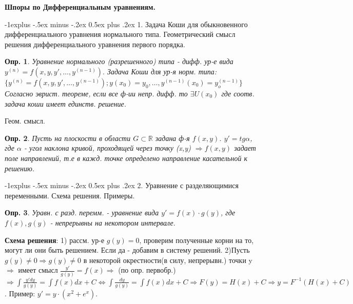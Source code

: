 \documentclass[unicode,10pt, landscape]{article}
\makeatletter
\renewcommand{\subsection}{\@startsection{subsection}{2}{0mm}%
                                {-1explus -.5ex minus -.2ex}%
                                {0.5ex plus .2ex}%
                                {\normalfont\normalsize\bfseries}}
\makeatother
\begin{document}
\raggedright
\footnotesize


\setlength{\premulticols}{1pt}
\setlength{\postmulticols}{1pt}
\setlength{\multicolsep}{1pt}
\setlength{\columnsep}{2pt}
\newtheorem{Def}{Опр.}
\newtheorem{Prop}{Св-во.}
\newtheorem{Th}{Теор.}

\begin{center}
     \Large{\textbf{Шпоры по Дифференциальным уравнениям.}} \\
\end{center}

\subsection{1. Задача Коши для обыкновенного дифференциального уравнения нормального типа. Геометрический смысл решения дифференциального уравнения первого порядка.}
\begin{Def}
Уравнение нормального (разрешенного) типа - дифф. ур-е вида $y^{(n)} = f(x, y, y', \ldots, y^{(n-1)}).$
Задача Коши для ур-я норм. типа: $\{y^{(n)} = f(x, y, y', \ldots, y^{(n-1)}); y(x_0) = y_0, \ldots, y^{(n-1)}(x_0) = y^{(n-1)}_o\}$
Согласно эврист. теореме, если все ф-ии непр. дифф. то $\exists U(x_0)$ где соотв. задача коши имеет единств. решение.
\end{Def}
Геом. смысл.
\begin{Def}
Пусть на плоскости в области $G \subset \mathbb{R}$ задана ф-я $f(x,y)$. $y' = tg\alpha$, где $\alpha$ - угол наклона кривой, проходящей через точку (x,y) $\Rightarrow f(x,y) $ задает поле направлений, т.е в кажд. точке определено направление касательной к решению.
\end{Def}


\subsection{2. Уравнение с разделяющимися переменными. Схема решения. Примеры.}
\begin{Def}
Уравн. с разд. перемм.  - уравнение вида $y' = f(x)\cdot g(y)$, где $f(x), g(y)$ - непрерывны на некотором интервале.
\end{Def}
{\bf Схема решения}: 1) рассм. ур-е $g(y) = 0$, проверим полученные корни на то, могут ли они быть решением. Если да - добавим в систему решений.
2)Пусть $g(y) \neq 0 \Rightarrow g(y) \neq 0$  в некоторой окрестности(в силу, непрерывн.) точки y $\Rightarrow$ имеет смысл $\frac{y'}{g(y)} = f(x) \Rightarrow$ (по опр. первобр.) $\Rightarrow \int\frac{y'dy}{g(y)} = \int f(x)dx + C \Leftrightarrow \int\frac{dy}{g(y)}=\int f(x)dx + C \Rightarrow F(y) = H(x) + C \Rightarrow y = F^{-1}(H(x) + C)$. Пример: $y' = y\cdot (x^2 + e^x)$.
\end{document}

